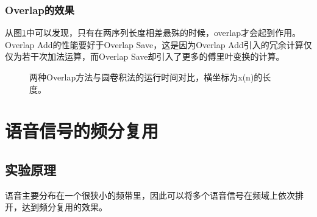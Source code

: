 \documentclass{article}
\begin{document}
\subsubsection{Overlap的效果}
从图\ref{fig:overlap}中可以发现，只有在两序列长度相差悬殊的时候，overlap才会起到作用。Overlap Add的性能要好于Overlap Save，这是因为Overlap Add引入的冗余计算仅仅为若干次加法运算，而Overlap Save却引入了更多的傅里叶变换的计算。
\begin{figure}[htbp]
\centering
{}
\caption{两种Overlap方法与圆卷积法的运行时间对比，横坐标为x(n)的长度。}
\label{fig:overlap}
\end{figure}

\section{语音信号的频分复用}
\subsection{实验原理}
语音主要分布在一个很狭小的频带里，因此可以将多个语音信号在频域上依次排开，达到频分复用的效果。
\end{document}
